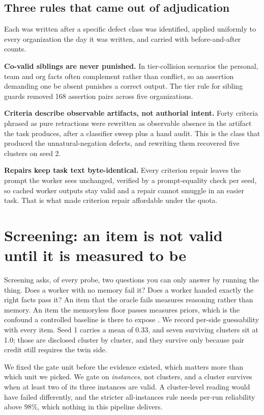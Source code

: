 \documentclass[11pt]{article}
\begin{document}
\subsection{Three rules that came out of adjudication}

Each was written after a specific defect class was identified, applied
uniformly to every organization the day it was written, and carried with
before-and-after counts.

\textbf{Co-valid siblings are never punished.} In tier-collision scenarios the
personal, team and org facts often complement rather than conflict, so an
assertion demanding one be absent punishes a correct output. The tier rule for
sibling guards removed 168 assertion pairs across five organizations.

\textbf{Criteria describe observable artifacts, not authorial intent.} Forty
criteria phrased as pure retractions were rewritten as observable absence in
the artifact the task produces, after a classifier sweep plus a hand audit.
This is the class that produced the unnatural-negation defects, and rewriting
them recovered five clusters on seed 2.

\textbf{Repairs keep task text byte-identical.} Every criterion repair leaves
the prompt the worker sees unchanged, verified by a prompt-equality check per
seed, so cached worker outputs stay valid and a repair cannot smuggle in an
easier task. That is what made criterion repair affordable under the quota.

\section{Screening: an item is not valid until it is measured to be}

Screening asks, of every probe, two questions you can only answer by running
the thing. Does a worker with no memory fail it? Does a worker handed exactly
the right facts pass it? An item that the oracle fails measures reasoning
rather than memory. An item the memoryless floor passes measures priors, which
is the confound a controlled baseline is there to expose \cite{memdelta}. We
record per-side guessability with every item. Seed 1 carries a mean of 0.33,
and seven surviving clusters sit at 1.0; those are disclosed cluster by
cluster, and they survive only because pair credit still requires the twin
side.

We fixed the gate unit before the evidence existed, which matters more than
which unit we picked. We gate on \emph{instances}, not clusters, and a cluster
survives when at least two of its three instances are valid. A cluster-level
reading would have failed differently, and the stricter all-instances rule
needs per-run reliability above 98\%, which nothing in this pipeline delivers.
\end{document}
